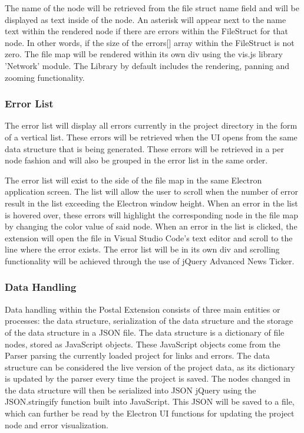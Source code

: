 \documentclass[letterpaper,10pt,titlepage,draftclsnofoot,onecolumn,onesided] {IEEEtran}
\begin{document}
The name of the node will be retrieved from the file struct name field and will be displayed as text inside of the node.
An asterisk will appear next to the name text within the rendered node if there are errors within the FileStruct for that node. In other words, if the size of the errors[] array within the FileStruct is not zero.
The file map will be rendered within its own div using the vis.js library 'Network' module. 
The Library by default includes the rendering, panning and zooming functionality. \cite{visjs}
	
\subsubsection{Error List}
The error list will display all errors currently in the project directory in the form of a vertical list. 
These errors will be retrieved when the UI opens from the same data structure that is being generated. 
These errors will be retrieved in a per node fashion and will also be grouped in the error list in the same order. 
	
The error list will exist to the side of the file map in the same Electron application screen. 
The list will allow the user to scroll when the number of error result in the list exceeding the Electron window height. 
When an error in the list is hovered over, these errors will highlight the corresponding node in the file map by changing the color value of said node. 
When an error in the list is clicked, the extension will open the file in Visual Studio Code's text editor and scroll to the line where the error exists.
The error list will be in its own div and scrolling functionality will be achieved through the use of jQuery Advanced News Ticker. \cite{newst}
	
\subsubsection{Data Handling}
Data handling within the Postal Extension consists of three main entities or processes: the data structure, serialization of the data structure and the storage of the data structure in a JSON file.
The data structure is a dictionary of file nodes, stored as JavaScript objects. These JavaScript objects come from the Parser parsing the currently loaded project for links and errors.
The data structure can be considered the live version of the project data, as its dictionary is updated by the parser every time the project is saved. 
The nodes changed in the data structure will then be serialized into JSON jQuery using the JSON.stringify function built into JavaScript.
This JSON will be saved to a file, which can further be read by the Electron UI functions for updating the project node and error visualization. \cite{stringify}
	
\end{document}
